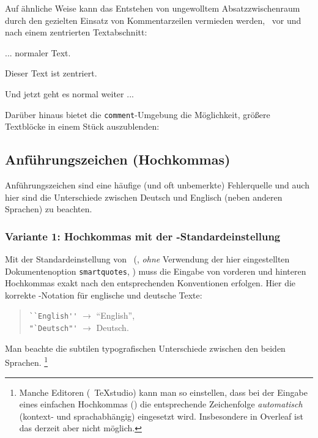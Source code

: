 \begin{sloppypar}
    \noindent
    Auf ähnliche Weise kann das Entstehen von ungewolltem Absatzzwischenraum
    durch den gezielten Einsatz von Kommentarzeilen vermieden werden, \zB\
    vor und nach einem zentrierten Textabschnitt:
\end{sloppypar}
%
\begin{LaTeXCode}[numbers=none]
... normaler Text.
%
\begin{center}
   Dieser Text ist zentriert.
\end{center}
%
Und jetzt geht es normal weiter ...
\end{LaTeXCode}
%
Darüber hinaus bietet die \verb!comment!-Umgebung die Möglichkeit, größere
Text\-blöcke in einem Stück auszublenden:
%
\begin{LaTeXCode}[numbers=none]

\end{LaTeXCode}

\subsection{Anführungszeichen (Hochkommas)}
\label{sec:anfuehrungszeichen}

Anführungszeichen sind eine häufige (und oft unbemerkte) Fehlerquelle und
auch hier sind die Unterschiede zwischen Deutsch und Englisch (neben anderen
Sprachen) zu beachten.

\subsubsection{Variante 1: Hochkommas mit der \latex-Standardeinstellung}

Mit der Standardeinstellung von \latex\ (\dah, \emph{ohne} Verwendung der
hier eingestellten Dokumentenoption \texttt{smartquotes}, \su)
muss die Eingabe von vorderen und hinteren Hochkommas exakt nach den
entsprechenden Konventionen erfolgen. Hier die korrekte \latex-Notation für
englische und deutsche Texte:
%
\begin{quote}
    \verb!``English''! $\rightarrow$ ``English'',\\
    \verb!"`Deutsch"'! $\rightarrow$ {\glqq}Deutsch{\grqq}.
\end{quote}
%
Man beachte die subtilen typografischen Unterschiede zwischen den beiden
Sprachen.%
\footnote{Manche Editoren (\zB\ \textsf{TeXstudio}) kann man so einstellen,
    dass bei der Eingabe eines einfachen Hochkommas (\texttt{\textquotedbl})
    die entsprechende Zeichenfolge \emph{automatisch} (kontext- und
    sprachabhängig) eingesetzt wird. Insbesondere in \textsf{Overleaf} ist
    das derzeit aber nicht möglich.}

